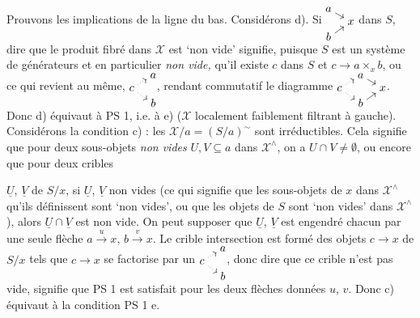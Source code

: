 \documentclass[11pt]{article}
\newcommand{\msp}[1]{\marginpar{\footnotesize [#1]}}
\newcommand{\X}{\mathscr{X}}
\begin{document}
Prouvons les implications de la ligne du bas. Considérons d). Si $\begin{tikzcd}[cramped, row sep=0.1em, column sep=0.8em, baseline=(current bounding box.center)] a \arrow[dr] & \\ & x \\ b \arrow[ur] & \end{tikzcd}$ dans $S$, dire que le produit fibré dans $\X$ est `non vide' signifie, puisque $S$ est un système de générateurs et en particulier \textit{non vide,} qu'il existe $c$ dans $S$ et $c\longrightarrow a\times_x b$, ou ce qui revient au même, $\begin{tikzcd}[cramped, row sep=0.1em, column sep=0.8em, baseline=(current bounding box.center)] & a \\ c \arrow[ur, dotted] \arrow[dr, dotted] & \\ & b \end{tikzcd}$, rendant commutatif le diagramme $\begin{tikzcd}[cramped, row sep=0.1em, column sep=0.8em, baseline=(current bounding box.center)] & a \arrow[dr] & \\ c \arrow[ur, dotted] \arrow[dr, dotted] & & x \\ & b \arrow[ur] & \end{tikzcd}$. Donc d) équivaut à PS 1, i.e. à e) ($\X$ localement faiblement filtrant à gauche). Considérons la condition c) : les $\X/a=(S/a)^\sim$ sont irréductibles. Cela signifie que pour deux sous-objets \textit{non vides} $U,V\subseteq a$ dans $\X^\wedge$, on a $U\cap V\neq\emptyset$, ou encore que pour deux cribles

\msp{page 22}$\underline{U}$, $\underline{V}$ de $S/x$, si $\underline{U}$, $\underline{V}$ non vides (ce qui signifie que les sous-objets de $x$ dans $\X^\wedge$ qu'ils définissent sont `non vides', ou que les objets de $S$ sont `non vides' dans $\X^\wedge$), alors $\underline{U}\cap\underline{V}$ est non vide. On peut supposer que $\underline{U}$, $\underline{V}$ est engendré chacun par une seule flèche $a\xrightarrow{u}x$, $b\xrightarrow{v}x$. Le crible intersection est formé des objets $c\longrightarrow x$ de $S/x$ tels que $c\longrightarrow x$ se factorise par un $\begin{tikzcd}[cramped, row sep=0.1em, column sep=0.8em, baseline=(current bounding box.center)] & a \\ c \arrow[ur, dotted] \arrow[dr, dotted] & \\ & b \end{tikzcd}$, donc dire que ce crible n'est pas vide, signifie que PS 1 est satisfait pour les deux flèches données $u$, $v$. Donc c) équivaut à la condition PS 1 e.
\end{document}
